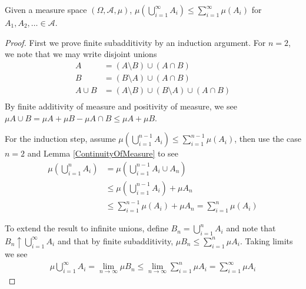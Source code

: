\begin{lem}Given a measure space $(\Omega, \mathcal{A}, \mu)$, $\mu
  \left (\bigcup_{i=1}^\infty A_i \right ) \leq \sum_{i=1}^\infty \mu(A_i)$  for $A_1, A_2, \dots \in \mathcal{A}$.
\end{lem}
\begin{proof}First we prove finite subadditivity by an induction argument.  For $n=2$, we note that we may
  write disjoint unions
\begin{align*}
A &= (A \setminus B) \cup (A \cap B) \\
B  &= (B\setminus A) \cup (A \cap B) \\
A \cup B  &= (A\setminus B)  \cup (B\setminus A) \cup (A \cap B) \\
\end{align*}
By finite additivity of measure and positivity of measure, we see $\mu A \cup B = \mu A + \mu B
- \mu A \cap B \leq \mu A + \mu B$. 

For the induction step, assume $\mu \left (\bigcup_{i=1}^{n-1} A_i \right
) \leq \sum_{i=1}^{n-1} \mu(A_i)$, then use the case $n=2$ and
Lemma \ref{ContinuityOfMeasure} to see
\begin{align*}
\mu \left (\bigcup_{i=1}^{n} A_i \right) &= \mu \left
  (\bigcup_{i=1}^{n-1} A_i  \cup A_n\right) \\
&\leq \mu \left (\bigcup_{i=1}^{n-1} A_i \right ) + \mu A_n \\
&\leq \sum_{i=1}^{n-1} \mu(A_i) + \mu A_n = \sum_{i=1}^n \mu(A_i)
\end{align*}

To extend the result to infinite unions, define $B_n = \bigcup_{i=1}^n
A_i$ and note that $B_n \uparrow \bigcup_{i=1}^\infty
A_i$ and that by finite subadditivity, $\mu B_n \leq \sum_{i=1}^n \mu
A_i$.  Taking limits we see
\begin{align*}
\mu \bigcup_{i=1}^\infty A_i = \lim_{n \to \infty} \mu B_n \leq \lim_{n
  \to \infty} \sum_{i=1}^n \mu A_i = \sum_{i=1}^\infty \mu A_i
\end{align*}
\end{proof}

